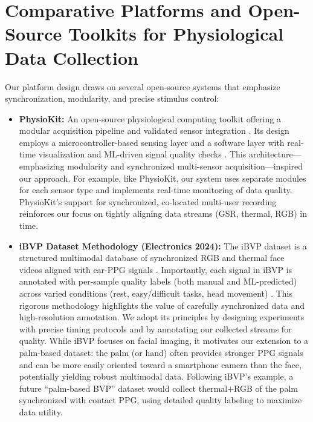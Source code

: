 \documentclass{report}
\begin{document}
    \section{Comparative Platforms and Open-Source Toolkits for Physiological Data Collection}
    \label{sec:platforms}

    Our platform design draws on several open-source systems that emphasize synchronization, modularity, and precise stimulus control:

    \begin{itemize}
        \item \textbf{PhysioKit:} An open-source physiological computing toolkit offering a modular acquisition pipeline and validated sensor integration \cite{physiokit}. Its design employs a microcontroller-based sensing layer and a software layer with real-time visualization and ML-driven signal quality checks \cite{physiokit}. This architecture---emphasizing modularity and synchronized multi-sensor acquisition---inspired our approach. For example, like PhysioKit, our system uses separate modules for each sensor type and implements real-time monitoring of data quality. PhysioKit's support for synchronized, co-located multi-user recording \cite{physiokit} reinforces our focus on tightly aligning data streams (GSR, thermal, RGB) in time.

        \item \textbf{iBVP Dataset Methodology (Electronics 2024):} The iBVP dataset is a structured multimodal database of synchronized RGB and thermal face videos aligned with ear-PPG signals \cite{ibvp}. Importantly, each signal in iBVP is annotated with per-sample quality labels (both manual and ML-predicted) across varied conditions (rest, easy/difficult tasks, head movement) \cite{ibvp}. This rigorous methodology highlights the value of carefully synchronized data and high-resolution annotation. We adopt its principles by designing experiments with precise timing protocols and by annotating our collected streams for quality. While iBVP focuses on facial imaging, it motivates our extension to a palm-based dataset: the palm (or hand) often provides stronger PPG signals and can be more easily oriented toward a smartphone camera than the face, potentially yielding robust multimodal data. Following iBVP's example, a future ``palm-based BVP'' dataset would collect thermal+RGB of the palm synchronized with contact PPG, using detailed quality labeling to maximize data utility.


\end{itemize}
\end{document}
